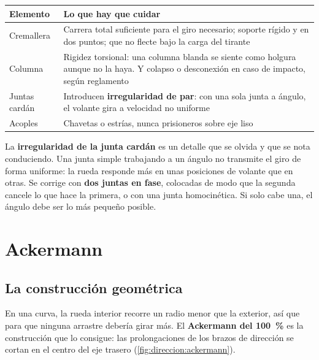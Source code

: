\begin{center}
\begin{tabularx}{\textwidth}{@{}lX@{}}
\toprule
\textbf{Elemento} & \textbf{Lo que hay que cuidar} \\
\midrule
Cremallera & Carrera total suficiente para el giro necesario; soporte rígido y
  en dos puntos; que no flecte bajo la carga del tirante \\
Columna & Rigidez torsional: una columna blanda se siente como holgura aunque no
  la haya. Y colapso o desconexión en caso de impacto, según reglamento \\
Juntas cardán & Introducen \textbf{irregularidad de par}: con una sola junta a
  ángulo, el volante gira a velocidad no uniforme \\
Acoples & Chavetas o estrías, nunca prisioneros sobre eje liso \\
\bottomrule
\end{tabularx}
\end{center}

\begin{ojo}
La \textbf{irregularidad de la junta cardán} es un detalle que se olvida y que se
nota conduciendo. Una junta simple trabajando a un ángulo no transmite el giro
de forma uniforme: la rueda responde más en unas posiciones de volante que en
otras. Se corrige con \textbf{dos juntas en fase}, colocadas de modo que la
segunda cancele lo que hace la primera, o con una junta homocinética. Si solo
cabe una, el ángulo debe ser lo más pequeño posible.
\end{ojo}

\section{Ackermann}
\label{sec:direccion:04}

\subsection{La construcción geométrica}

En una curva, la rueda interior recorre un radio menor que la exterior, así que
para que ninguna arrastre debería girar más. El \textbf{Ackermann del
\SI{100}{\percent}} es la construcción que lo consigue: las prolongaciones de
los brazos de dirección se cortan en el centro del eje trasero
(\cref{fig:direccion:ackermann}).

